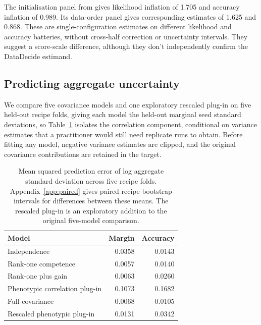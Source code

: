 \documentclass{article}
\begin{document}
The initialisation panel from \citet{heineman2025} gives likelihood inflation of 1.705 and accuracy inflation of 0.989. Its data-order panel gives corresponding estimates of 1.625 and 0.868. These are single-configuration estimates on different likelihood and accuracy batteries, without cross-half correction or uncertainty intervals. They suggest a score-scale difference, although they don't independently confirm the DataDecide estimand.

\subsection{Predicting aggregate uncertainty}
We compare five covariance models and one exploratory rescaled plug-in on five held-out recipe folds, giving each model the held-out marginal seed standard deviations, so Table~\ref{tab:prediction} isolates the correlation component, conditional on variance estimates that a practitioner would still need replicate runs to obtain. Before fitting any model, negative variance estimates are clipped, and the original covariance contributions are retained in the target.

\begin{table}[!htb]
\centering
\caption{Mean squared prediction error of log aggregate standard deviation across five recipe folds. Appendix~\ref{app:paired} gives paired recipe-bootstrap intervals for differences between these means. The rescaled plug-in is an exploratory addition to the original five-model comparison.}
\label{tab:prediction}
\small\setlength{\tabcolsep}{4pt}\renewcommand{\arraystretch}{1.12}
\begin{tabular}{lrr}
\toprule
Model & Margin & Accuracy\\
\midrule
Independence & 0.0358 & 0.0143\\
Rank-one competence & 0.0057 & 0.0140\\
Rank-one plus gain & 0.0063 & 0.0260\\
Phenotypic correlation plug-in & 0.1073 & 0.1682\\
Full covariance & 0.0068 & 0.0105\\
Rescaled phenotypic plug-in & 0.0131 & 0.0342\\
\bottomrule
\end{tabular}
\end{table}
\end{document}
